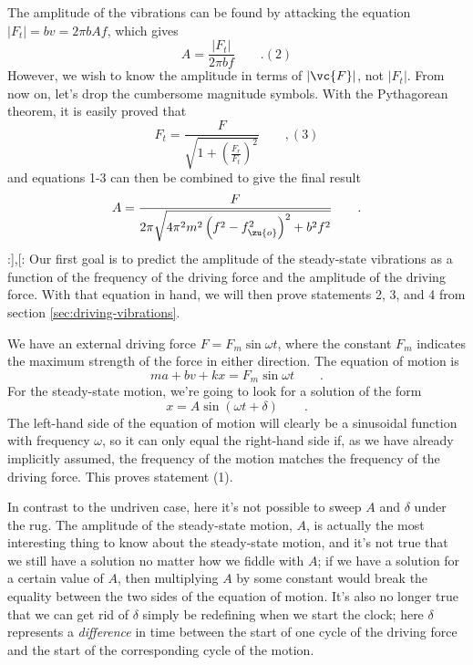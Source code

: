 The amplitude of the vibrations can be found by attacking
the equation $|F_t|=bv=2\pi bAf$, which gives
\begin{equation}
  A = \frac{|F_t|}{2\pi bf} \qquad . (2)
\end{equation}
However, we wish to know the amplitude in terms of $|\vc{F}|$, not
$|F_t|$. From now on, let's drop the cumbersome magnitude
symbols. With the Pythagorean theorem, it is easily proved that
\begin{equation}
  F_t = \frac{F}{\sqrt{1+\left(\frac{F_r}{F_t}\right)^2}} \qquad , (3)
\end{equation}
and equations 1-3 can then be combined to give the final result
\begin{equation}\label{resonance-amplitude-equation}
 A = \frac{F}{2\pi\sqrt{4\pi^2m^2\left(f^2-f_\zu{o}^2\right)^2+b^2f^2}} \qquad .
\end{equation}
:],[:
Our first goal is to predict the amplitude of the steady-state
vibrations as a function of the frequency of the driving
force and the amplitude of the driving force. With that
equation in hand, we will then prove statements 2, 3, and 4
from  section \ref{sec:driving-vibrations}.

        We have an external driving force $F=F_m \sin \omega t$, where the constant
        $F_m$ indicates the maximum strength of the force in either direction. The equation
        of motion is
        \begin{equation}\label{eqn:resonancemotion}
                ma+bv+kx = F_m \sin \omega t 
                                 \qquad .
        \end{equation}
        For the steady-state motion,
        we're going to look for a solution of the form
        \begin{equation*}
                x = A \sin (\omega{}t+\delta) \qquad .
        \end{equation*}
        The left-hand side of the equation of motion will clearly be a sinusoidal function with frequency $\omega$,
        so it can only equal the right-hand side if, as we have already implicitly assumed, the frequency of the
        motion matches the frequency of the driving force. This proves statement (1).

        In contrast to the undriven case, here it's not possible to sweep $A$ and $\delta$ 
        under the rug. The amplitude of the steady-state motion, $A$, is actually the
        most interesting thing to know about the steady-state motion, and it's not true that we
        still have a solution no matter how we fiddle with $A$; if we have a solution for
        a certain value of $A$, then multiplying $A$ by some constant would break the
        equality between the two sides of the equation of motion. It's also no longer true
        that we can get rid of $\delta$ simply be redefining when we start the clock; here
        $\delta$ represents a \emph{difference} in time between the start of one cycle of the driving
        force and the start of the corresponding cycle of the motion.

